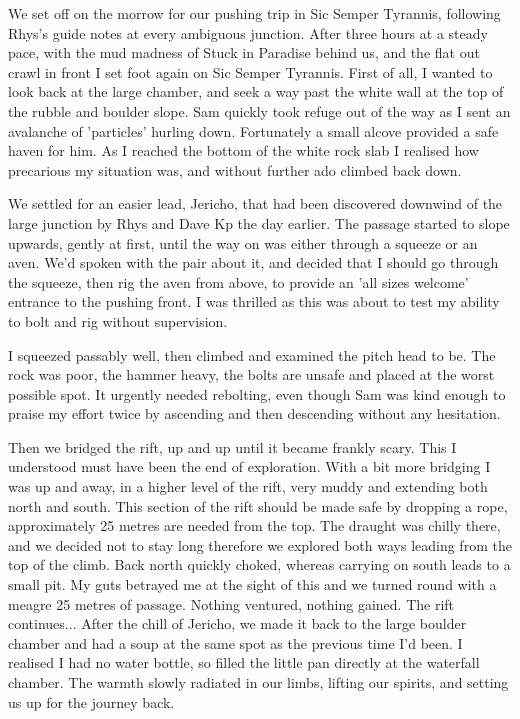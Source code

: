 \documentclass[onecolumn]{book}
\begin{document}
We set off on the morrow for our pushing trip in Sic Semper Tyrannis, following Rhys's guide notes at every ambiguous junction. After three hours at a steady pace, with the mud madness of Stuck in Paradise behind us, and the flat out crawl in front I set foot again on Sic Semper Tyrannis.
First of all, I wanted to look back at the large chamber, and seek a way past the white wall at the top of the rubble and boulder slope. Sam quickly took refuge out of the way as I sent an avalanche of 'particles' hurling down. Fortunately a small alcove provided a safe haven for him. As I reached the bottom of the white rock slab I realised how precarious my situation was, and without further ado climbed back down.

We settled for an easier lead, Jericho, that had been discovered downwind of the large junction by Rhys and Dave Kp the day earlier. The passage started to slope upwards, gently at first, until the way on was either through a squeeze or an aven. We'd spoken with the pair about it, and decided that I should go through the squeeze, then rig the aven from above, to provide an 'all sizes welcome' entrance to the pushing front. I was thrilled as this was about to test my ability to bolt and rig without supervision.

I squeezed passably well, then climbed and examined the pitch head to be. The rock was poor, the hammer heavy, the bolts are unsafe and placed at the worst possible spot. It urgently needed rebolting, even though Sam was kind enough to praise my effort twice by ascending and then descending without any hesitation.

Then we bridged the rift, up and up until it became frankly scary. This I understood must have been the end of exploration. With a bit more bridging I was up and away, in a higher level of the rift, very muddy and extending both north and south. This section of the rift should be made safe by dropping a rope, approximately 25 metres are needed from the top. The draught was chilly there, and we decided not to stay long therefore we explored both ways leading from the top of the climb. Back north quickly choked, whereas carrying on south leads to a small pit. My guts betrayed me at the sight of this and we turned round with a meagre 25 metres of passage. Nothing ventured, nothing gained. The rift continues... After the chill of Jericho, we made it back to the large boulder chamber and had a soup at the same spot as the previous time I'd been. I realised I had no water bottle, so filled the little pan directly at the waterfall chamber. The warmth slowly radiated in our limbs, lifting our spirits, and setting us up for the journey back.
\end{document}
